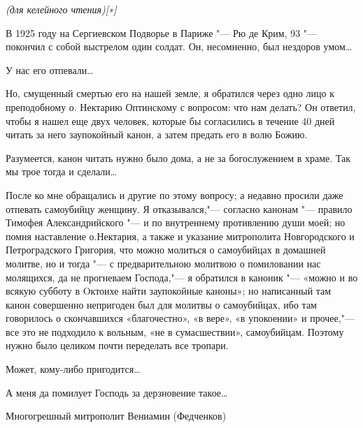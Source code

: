 \mychapterending

 
 

\itshape  (для келейного
чтения)[∗]\normalfont{}



   В 1925 году на Сергиевском Подворье в Париже "--- Рю де Крим, 93 "---
покончил с собой выстрелом один солдат. Он, несомненно, был нездоров
умом…



   У нас его отпевали…



   Но, смущенный смертью его на нашей земле, я обратился через одно лицо
к преподобному о. Нектарию Оптинскому с вопросом: что нам делать? Он
ответил, чтобы я нашел еще двух человек, которые бы согласились в течение
40 дней читать за него заупокойный канон, а затем предать его в волю
Божию.



   Разумеется, канон читать нужно было дома, а не за богослужением в
храме. Так мы трое тогда и сделали…



   После ко мне обращались и другие по этому вопросу; а недавно
просили даже отпевать самоубийцу женщину. Я отказывался,"--- согласно
канонам "--- правило Тимофея Александрийского "--- и по внутреннему
противлению души моей; но помня наставление о.Нектария, а также и
указание митрополита Новгородского и Петроградского Григория, что
можно молиться о самоубийцах в домашней молитве, но и тогда "--- с
предварительною молитвою о помиловании нас молящихся, да не
прогневаем Господа,"--- я обратился в каноник "--- «можно и во всякую субботу
в Oктоихе найти заупокойные каноны»; но написанный там канон
совершенно непригоден был для молитвы о самоубийцах, ибо там
говорилось о скончавшихся «благочестно», «в вере», «в упокоении»
и прочее,"--- все это не подходило к вольным, «не в сумасшествии»,
самоубийцам. Поэтому нужно было целиком почти переделать все
тропари.



   Может, кому-либо пригодится…



   А меня да помилует Господь за дерзновение такое…



   Многогрешный митрополит Вениамин (Федченков)
   


 

